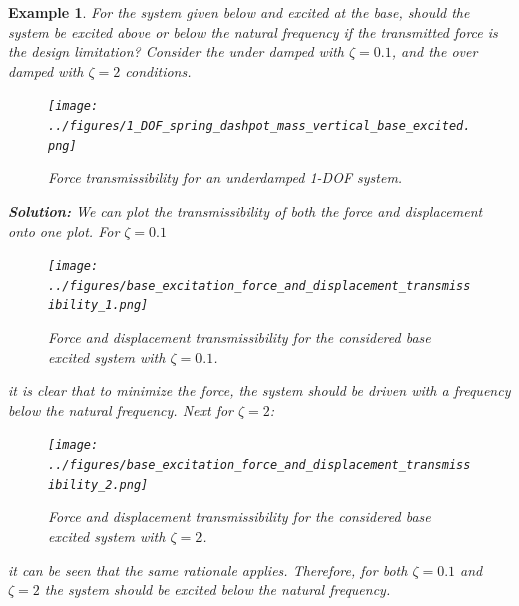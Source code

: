 \documentclass[12pt,letter]{article}
\newtheorem{ex}{Example}
\numberwithin{ex}{section} %
\newenvironment{example}{\begin{mdframed}[middlelinewidth=0.5mm]\begin{ex}\normalfont}{\end{ex}\end{mdframed}}
\numberwithin{re}{section} %
\numberwithin{pr}{section} %
\begin{document}
				\begin{example}
					
					For the system given below and excited at the base, should the system be excited above or below the natural frequency if the transmitted force is the design limitation? Consider the under damped with $\zeta=0.1$, and the over damped with $\zeta=2$ conditions. 
		
					\begin{figure}[H]
						\centering
						\texttt{[image: ../figures/1\_DOF\_spring\_dashpot\_mass\_vertical\_base\_excited.png]}
						\caption{Force transmissibility for an underdamped 1-DOF system.}
					\end{figure}		
				
					\noindent\textbf{Solution:} We can plot the transmissibility of both the force and displacement onto one plot. For $\zeta=0.1$
					\begin{figure}[H]
						\centering
						\texttt{[image: ../figures/base\_excitation\_force\_and\_displacement\_transmissibility\_1.png]}
						\caption{Force and displacement transmissibility for the considered base excited system with $\zeta=0.1$.}
					\end{figure}
					\noindent it is clear that to minimize the force, the system should be driven with a frequency below the natural frequency. Next for  $\zeta=2$:
					\begin{figure}[H]
						\centering
						\texttt{[image: ../figures/base\_excitation\_force\_and\_displacement\_transmissibility\_2.png]}
						\caption{Force and displacement transmissibility for the considered base excited system with $\zeta=2$.}
					\end{figure}
					\noindent it can be seen that the same rationale applies. Therefore, for both $\zeta=0.1$ and $\zeta=2$ the system should be excited below the natural frequency.
				
				\end{example}
	
			
							
\end{document}
